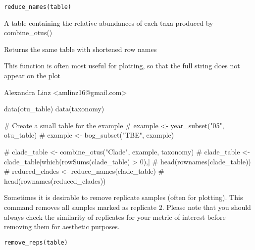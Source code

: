 \documentclass[a4paper]{book}
\begin{document}
%
\begin{Usage}
\begin{verbatim}
reduce_names(table)
\end{verbatim}
\end{Usage}
%
\begin{Arguments}
\begin{ldescription}
\item[\code{table}] 
A table containing the relative abundances of each taxa produced by combine\_otus()

\end{ldescription}
\end{Arguments}
%
\begin{Value}
Returns the same table with shortened row names
\end{Value}
%
\begin{Note}\relax
This function is often most useful for plotting, so that the full string does not appear on the plot
\end{Note}
%
\begin{Author}\relax
Alexandra Linz <amlinz16@gmail.com>
\end{Author}
%
\begin{Examples}
\begin{ExampleCode}
data(otu_table)
data(taxonomy)

# Create a small table for the example
# example <- year_subset("05", otu_table)
# example <- bog_subset("TBE", example)

# clade_table <- combine_otus("Clade", example, taxonomy)
# clade_table <- clade_table[which(rowSums(clade_table) > 0),]
# head(rownames(clade_table))
# reduced_clades <- reduce_names(clade_table)
# head(rownames(reduced_clades))
\end{ExampleCode}
\end{Examples}
%
\begin{Description}\relax
Sometimes it is desirable to remove replicate samples (often for plotting). This command removes all samples marked as replicate 2. Please note that you should always check the similarity of replicates for your metric of interest before removing them for aesthetic purposes.
\end{Description}
%
\begin{Usage}
\begin{verbatim}
remove_reps(table)
\end{verbatim}
\end{Usage}
\end{document}
